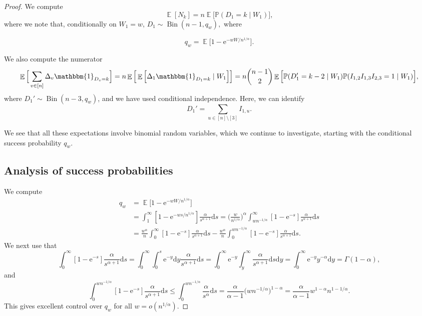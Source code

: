 \documentclass[ twocolumn,
 amsmath,amssymb,
 aps, pre, amsthm, amsfonts,
]{revtex4-2}
\DeclareMathOperator{\EX}{\mathbb{E}}%
\newcommand{\e}{\mathrm{e}}
\newcommand{\prob}{\mathbb{P}}
\newcommand{\nn}{\nonumber}
\begin{document}
\begin{proof}
    We compute 
\begin{equation}
\EX[N_k]=n\EX\big[\prob(D_1=k\mid W_1)\big],
\end{equation}
where we note that, conditionally on $W_1=w$, $D_1 \sim \operatorname{Bin}\left(n-1, q_w\right),$ where

\begin{equation}
    q_w=\EX\big[1-\e^{-w W/n^{1/\alpha}}\big].
\end{equation}

We also compute the numerator 
\begin{equation}
    \EX\Big[\sum_{v\in [n]}\Delta_v\mathbbm{1}_{D_v=k}\Big] =n\EX\Big[\EX\Big[\Delta_1\mathbbm{1}_{D_1=k}\mid W_1\Big]\Big] =n{{n-1}\choose{2}}\EX\Big[\prob(D_1'=k-2\mid W_1)\prob(I_{1,2}I_{1,3}I_{2,3}=1\mid W_1)\Big],
\end{equation}
where $D_1'\sim \operatorname{Bin}(n-3, q_w)$, and we have used conditional independence. Here, we can identify
\begin{equation}
D_1'=\sum_{u\in[n]\setminus [3]} I_{1,u}.
\end{equation}

We see that all these expectations involve binomial random variables, which we continue to investigate, starting with the conditional success probability $q_w$.

\subsection{Analysis of success probabilities}
We compute
\begin{align}
    q_w &=\EX\big[1-\e^{-w W/n^{1/\alpha}}\big]
	\\
    & =\int_1^{\infty} [1-\e^{-w s/n^{1/\alpha}}]\frac{\alpha}{s^{\alpha+1}}{\mathrm d}s =\big(\frac{w}{n^{1/\alpha}}\big)^\alpha \int_{w n^{-1/\alpha}}^{\infty} [1-\e^{-s}]\frac{\alpha}{s^{\alpha+1}}{\mathrm d}s\nn\\
    &=\frac{w^{\alpha}}{n} \int_{0}^{\infty} [1-\e^{-s}]\frac{\alpha}{s^{\alpha+1}}{\mathrm d}s
	-\frac{w^{\alpha}}{n}\int_0^{w n^{-1/\alpha}}[1-\e^{-s}]\frac{\alpha}{s^{\alpha+1}}{\mathrm d}s.\nn
\end{align}
We next use that
\begin{equation}
    \int_{0}^{\infty} [1-\e^{-s}]\frac{\alpha}{s^{\alpha+1}}{\mathrm d}s
	=\int_{0}^{\infty} \int_0^s \e^{-y}{\mathrm d}y\frac{\alpha}{s^{\alpha+1}}{\mathrm d}s  
	=\int_{0}^{\infty} \e^{-y} \int_y^\infty  \frac{\alpha}{s^{\alpha+1}}{\mathrm d}s{\mathrm d}y 
	=\int_{0}^{\infty} \e^{-y} y^{-\alpha}{\mathrm d}y=\Gamma(1-\alpha),
\end{equation}
and
\begin{equation}
    \int_0^{w n^{-1/\alpha}}[1-\e^{-s}]\frac{\alpha}{s^{\alpha+1}}{\mathrm d}s
	\leq \int_0^{w n^{-1/\alpha}}\frac{\alpha}{s^{\alpha}}{\mathrm d}s
	=\frac{\alpha}{\alpha-1} \big(w n^{-1/\alpha}\big)^{1-\alpha}
	=\frac{\alpha}{\alpha-1} w^{1-\alpha}  n^{1-1/\alpha}.
\end{equation}
This gives excellent control over $q_w$ for all $w=o(n^{1/\alpha})$.


\end{proof}
\end{document}
